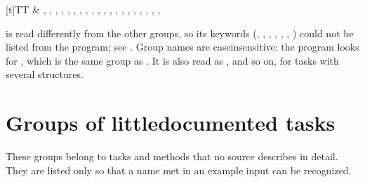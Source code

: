 \documentclass[letterpaper,10pt,english,openany,oneside]{sphinxmanual}
\begin{document}
\begin{savenotes}
\begin{tabulary}{\linewidth}[t]{TT}
&
\sphinxAtStartPar
{}, {\hyperref[\detokenize{reference/dynamic:dynamic-e}]{}}, {\hyperref[\detokenize{reference/dynamic:dynamic-n}]{}}, {\hyperref[\detokenize{reference/dynamic:dynamic-m}]{}}, , , , {\hyperref[\detokenize{reference/dynamic:dynamic-i}]{}}, , , , {\hyperref[\detokenize{reference/dynamic:dynamic-dx}]{}}, , , {\hyperref[\detokenize{reference/dynamic:dynamic-hb}]{}}, , , {\hyperref[\detokenize{reference/dynamic:dynamic-v1}]{}}, , {\hyperref[\detokenize{reference/dynamic:dynamic-file}]{}}, 
\\
\sphinxbottomrule
\end{tabulary}
\sphinxtableafterendhook\par
\sphinxattableend\end{savenotes}

\sphinxAtStartPar
{} is read differently from the other groups, so its keywords (, , , ,
, , ) could not be listed from the program; see {\hyperref[\detokenize{reference/molecule:group-molecule}]{}}.
Group names are case\sphinxhyphen{}insensitive: the program looks for , which is the same group as . It is
also read as ,  and so on, for tasks with several structures.




\section{Groups of little\sphinxhyphen{}documented tasks}
\label{\detokenize{binary-keywords:groups-of-little-documented-tasks}}
\sphinxAtStartPar
These groups belong to tasks and methods that no source describes in detail. They are listed only so that a name
met in an example input can be recognized.
\end{document}
